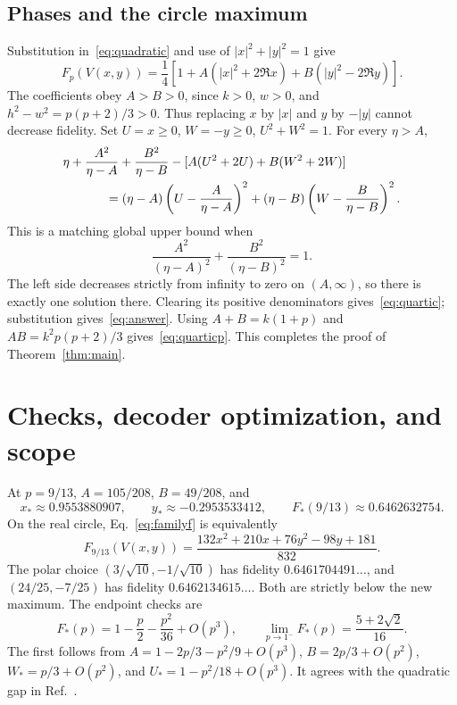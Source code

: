 \documentclass[11pt]{article}
\begin{document}
\subsection{Phases and the circle maximum}
Substitution in~\eqref{eq:quadratic} and use of $|x|^2+|y|^2=1$ give
\begin{equation}\label{eq:familyf}
 F_p(V(x,y))=\frac14\left[
 1+A(|x|^2+2\Re x)+B(|y|^2-2\Re y)\right].
\end{equation}
The coefficients obey $A>B>0$, since $k>0$, $w>0$, and
$h^2-w^2=p(p+2)/3>0$. Thus replacing $x$ by $|x|$ and $y$ by $-|y|$
cannot decrease fidelity. Set $U=x\geq0$, $W=-y\geq0$,
$U^2+W^2=1$. For every $\eta>A$,
\begin{align}
 &\eta+\frac{A^2}{\eta-A}+\frac{B^2}{\eta-B}
 -[A(U^2+2U)+B(W^2+2W)]\notag\\
 &\hspace{12mm}=(\eta-A)\left(U-\frac{A}{\eta-A}\right)^2
 +(\eta-B)\left(W-\frac{B}{\eta-B}\right)^2.\label{eq:sos}
\end{align}
This is a matching global upper bound when
\begin{equation}\label{eq:secular}
 \frac{A^2}{(\eta-A)^2}+\frac{B^2}{(\eta-B)^2}=1.
\end{equation}
The left side decreases strictly from infinity to zero on $(A,\infty)$,
so there is exactly one solution there. Clearing its positive denominators
gives~\eqref{eq:quartic}; substitution gives~\eqref{eq:answer}.
Using $A+B=k(1+p)$ and $AB=k^2p(p+2)/3$ gives~\eqref{eq:quarticp}.
This completes the proof of Theorem~\ref{thm:main}.

\section{Checks, decoder optimization, and scope}
At $p=9/13$, $A=105/208$, $B=49/208$, and
\[
 x_*\approx0.9553880907,\qquad y_*\approx-0.2953533412,\qquad
 F_*(9/13)\approx0.6462632754.
\]
On the real circle, Eq.~\eqref{eq:familyf} is equivalently
\[
 F_{9/13}(V(x,y))=\frac{132x^2+210x+76y^2-98y+181}{832}.
\]
The polar choice $(3/\sqrt{10},-1/\sqrt{10})$ has fidelity
$0.6461704491\ldots$, and $(24/25,-7/25)$ has fidelity
$0.6462134615\ldots$. Both are strictly below the new maximum.
The endpoint checks are
\begin{equation}
 F_*(p)=1-\frac p2-\frac{p^2}{36}+O(p^3),\qquad
 \lim_{p\to1^-}F_*(p)=\frac{5+2\sqrt2}{16}.
\end{equation}
The first follows from $A=1-2p/3-p^2/9+O(p^3)$,
$B=2p/3+O(p^2)$, $W_*=p/3+O(p^2)$, and
$U_*=1-p^2/18+O(p^3)$. It agrees with the quadratic gap in
Ref.~\cite{LiJiang}.
\end{document}
